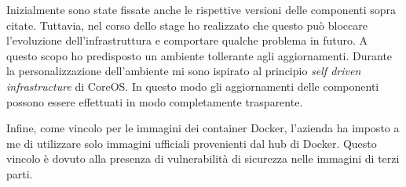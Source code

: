 Inizialmente sono state fissate anche le rispettive versioni delle componenti 
sopra citate. Tuttavia, nel corso dello stage ho realizzato che questo può 
bloccare l'evoluzione dell'infrastruttura e comportare qualche problema in 
futuro. A questo scopo ho predisposto un ambiente tollerante agli 
aggiornamenti. Durante la personalizzazione dell'ambiente mi sono ispirato al 
principio  \textit{self driven infrastructure} di CoreOS. 
In questo modo gli aggiornamenti delle componenti possono essere effettuati in 
modo completamente trasparente.

Infine, come vincolo per le immagini dei container Docker, l'azienda ha imposto a me di 
utilizzare solo immagini ufficiali provenienti dal hub di Docker. Questo 
vincolo è dovuto alla presenza di vulnerabilità di sicurezza nelle immagini di 
terzi parti.